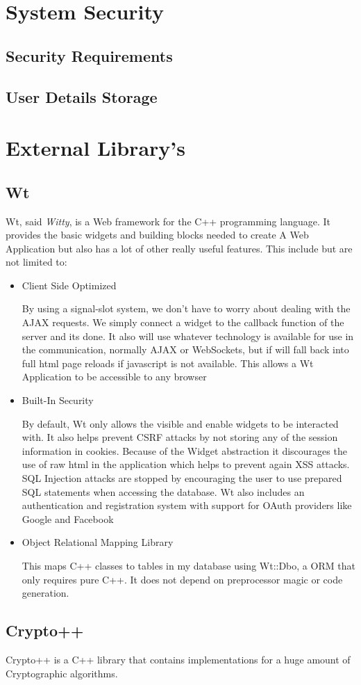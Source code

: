\section{System Security}
\subsection{Security Requirements}
\subsection{User Details Storage}

\section{External Library's}
\subsection{Wt}

Wt, said \textit{Witty}, is a Web framework for the C++ programming language. It provides the basic widgets and building blocks needed to create A Web Application but also has a lot of other really useful features. This include but are not limited to:

\begin{itemize}
\item{Client Side Optimized

By using a signal-slot system, we don't have to worry about dealing with the AJAX requests. We simply connect a widget to the callback function of the server and its done. It also will use whatever technology is available for use in the communication, normally AJAX or WebSockets, but if will fall back into full html page reloads if javascript is not available. This allows a Wt Application to be accessible to any browser}
\item{Built-In Security

By default, Wt only allows the visible and enable widgets to be interacted with. It also helps prevent CSRF attacks by not storing any of the session information in cookies. Because of the Widget abstraction it discourages the use of raw html in the application which helps to prevent again XSS attacks. SQL Injection attacks are stopped by encouraging the user to use prepared SQL statements when accessing the database. Wt also includes an authentication and registration system with support for OAuth providers like Google and Facebook}
\item{Object Relational Mapping Library

This maps C++ classes to tables in my database using Wt::Dbo, a ORM that only requires pure C++. It does not depend on preprocessor magic or code generation.}
\end{itemize}

\subsection{Crypto++}

Crypto++ is a C++ library that contains implementations for a huge amount of Cryptographic algorithms.

